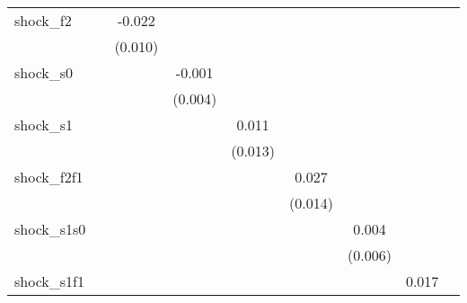 {\begin{tabular}{l*{8}{c}}
\addlinespace
shock\_f2    &                     &      -0.022\sym{**} &                     &                     &                     &                     &                     &                     \\
            &                     &     (0.010)         &                     &                     &                     &                     &                     &                     \\
\addlinespace
shock\_s0    &                     &                     &      -0.001         &                     &                     &                     &                     &                     \\
            &                     &                     &     (0.004)         &                     &                     &                     &                     &                     \\
\addlinespace
shock\_s1    &                     &                     &                     &       0.011         &                     &                     &                     &                     \\
            &                     &                     &                     &     (0.013)         &                     &                     &                     &                     \\
\addlinespace
shock\_f2f1  &                     &                     &                     &                     &       0.027\sym{*}  &                     &                     &                     \\
            &                     &                     &                     &                     &     (0.014)         &                     &                     &                     \\
\addlinespace
shock\_s1s0  &                     &                     &                     &                     &                     &       0.004         &                     &                     \\
            &                     &                     &                     &                     &                     &     (0.006)         &                     &                     \\
\addlinespace
shock\_s1f1  &                     &                     &                     &                     &                     &                     &       0.017         &                     \\

\end{tabular}}
